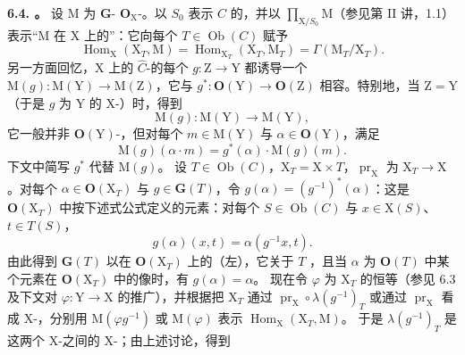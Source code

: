 \textbf{6.4. 。} 设 $\mathrm M$ 为 $\mathbf G$- $\mathbf O_{\mathrm X}$-。以 $S_0$ 表示 $C$ 的，并以 $\prod_{\mathrm X/S_0}\mathrm M$（参见第 II 讲，1.1）表示“$\mathrm M$ 在 $\mathrm X$ 上的”：它向每个 $T\in\operatorname{Ob}(C)$ 赋予
\[
\operatorname{Hom}_{\mathrm X}(\mathrm X_T,\mathrm M)=\operatorname{Hom}_{\mathrm X_T}(\mathrm X_T,\mathrm M_T)=\Gamma(\mathrm M_T/\mathrm X_T).
\]
另一方面回忆，$\mathrm X$ 上的 $\widehat C$-的每个 $g:\mathrm Z\to\mathrm Y$ 都诱导一个 $\mathrm M(g):\mathrm M(\mathrm Y)\to\mathrm M(\mathrm Z)$，它与 $g^*:\mathbf O(\mathrm Y)\to\mathbf O(\mathrm Z)$ 相容。特别地，当 $\mathrm Z=\mathrm Y$（于是 $g$ 为 $\mathrm Y$ 的 $\mathrm X$-）时，得到
\[
\mathrm M(g):\mathrm M(\mathrm Y)\longrightarrow\mathrm M(\mathrm Y),
\]
它一般并非 $\mathbf O(\mathrm Y)$-，但对每个 $m\in\mathrm M(\mathrm Y)$ 与 $\alpha\in\mathbf O(\mathrm Y)$，满足
\[
\mathrm M(g)(\alpha\cdot m)=g^*(\alpha)\cdot\mathrm M(g)(m).
\]
下文中简写 $g^*$ 代替 $\mathrm M(g)$。
设 $T\in\operatorname{Ob}(C)$，$\mathrm X_T=\mathrm X\times T$，$\operatorname{pr}_{\mathrm X}$ 为 $\mathrm X_T\to\mathrm X$。对每个 $\alpha\in\mathbf O(\mathrm X_T)$ 与 $g\in\mathbf G(T)$，令 $g(\alpha)=(g^{-1})^*(\alpha)$：这是 $\mathbf O(\mathrm X_T)$ 中按下述式公式定义的元素：对每个 $S\in\operatorname{Ob}(C)$ 与 $x\in\mathrm X(S)$、$t\in T(S)$，
\[
g(\alpha)(x,t)=\alpha(g^{-1}x,t).
\]
由此得到 $\mathbf G(T)$ 以在 $\mathbf O(\mathrm X_T)$ 上的（左），它关于 $T$ ，且当 $\alpha$ 为 $\mathbf O(T)$ 中某个元素在 $\mathbf O(\mathrm X_T)$ 中的像时，有 $g(\alpha)=\alpha$。
现在令 $\varphi$ 为 $\mathrm X_T$ 的恒等（参见 6.3 及下文对 $\varphi:\mathrm Y\to\mathrm X$ 的推广），并根据把 $\mathrm X_T$ 通过 $\operatorname{pr}_{\mathrm X}\circ\lambda(g^{-1})_T$ 或通过 $\operatorname{pr}_{\mathrm X}$ 看成 $\mathrm X$-，分别用 $\mathrm M(\varphi g^{-1})$ 或 $\mathrm M(\varphi)$ 表示 $\operatorname{Hom}_{\mathrm X}(\mathrm X_T,\mathrm M)$。
于是 $\lambda(g^{-1})_T$ 是这两个 $\mathrm X$-之间的 $\mathrm X$-；由上述讨论，得到
